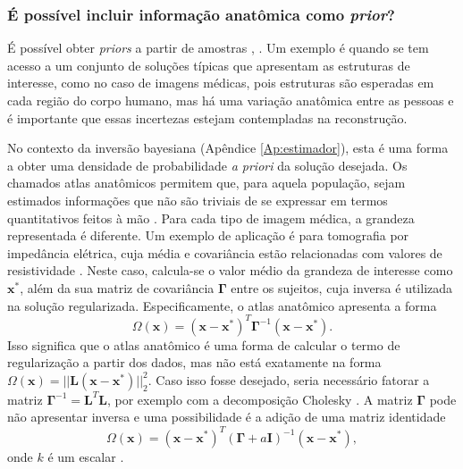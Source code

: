 \subsubsection{É possível incluir informação anatômica como \textit{prior}?}\label{sec:atlas}

É possível obter \textit{priors} a partir de amostras \cite{Calvetti2018a}, \cite[Seção 3.3.5]{kaipio2005statistical}. Um exemplo é quando se tem acesso a um conjunto de soluções típicas que apresentam as estruturas de interesse, como no caso de imagens médicas, pois estruturas são esperadas em cada região do corpo humano, mas há uma variação anatômica entre as pessoas e é importante que essas incertezas estejam contempladas na reconstrução. 

No contexto da inversão bayesiana (Apêndice \ref{Ap:estimador}), esta é uma forma a obter uma densidade de probabilidade \textit{a priori} da solução desejada. Os chamados atlas anatômicos \cite[pág. 70]{kaipio2005statistical} permitem que, para aquela população, sejam estimados informações que não são triviais de se expressar em termos quantitativos feitos à mão \cite{Calvetti2018a}. Para cada tipo de imagem médica, a grandeza representada é diferente. Um exemplo de aplicação é para tomografia por impedância elétrica, cuja média e covariância estão relacionadas com valores de resistividade \cite{Moura2021}.  Neste caso, calcula-se o valor médio da grandeza de interesse como $\mathbf{x}^*$, além da sua matriz de covariância $\bm{\Gamma}$ entre os sujeitos, cuja inversa é utilizada na solução regularizada. Especificamente, o atlas anatômico apresenta a forma 
 \begin{equation}
\Omega(\mathbf{x}) = \left( \mathbf{x} - \mathbf{x}^*\right)^T  \bm{\Gamma}^{-1} \left( \mathbf{x} - \mathbf{x}^*\right).
\end{equation}
Isso significa que o atlas anatômico é uma forma de calcular o termo de regularização a partir dos dados, mas não está exatamente na forma $\Omega(\mathbf{x}) = \vert \vert \mathbf{L} \left(\mathbf{x} - \mathbf{x}^*\right)\vert \vert^2_2$. Caso isso fosse desejado, seria necessário fatorar a matriz $\bm{\Gamma}^{-1} = \mathbf{L}^T \mathbf{L}$, por exemplo com a decomposição Cholesky \cite[pág. 112]{calvetti2007introduction}. A matriz $\bm{\Gamma}$ pode não apresentar inversa \cite[págs. 70-1]{kaipio2005statistical} e uma possibilidade é a adição de uma matriz identidade 
\begin{equation}
\Omega(\mathbf{x}) = \left( \mathbf{x} - \mathbf{x}^*\right)^T \left( \bm{\Gamma} + a \mathbf{I} \right)^{-1} \left( \mathbf{x} - \mathbf{x}^*\right), 
\end{equation}
onde $k$ é um escalar \cite[pág. 50]{Camargo2013}. 


